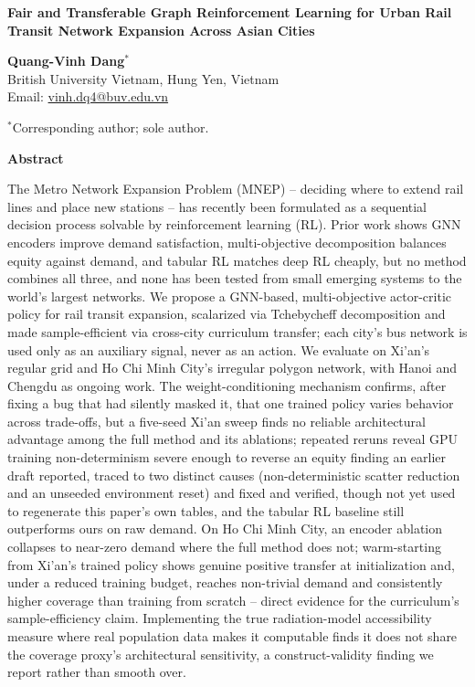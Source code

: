 \documentclass[11pt,a4paper]{article}
\begin{document}
\begin{center}
{\LARGE\bfseries Fair and Transferable Graph Reinforcement Learning for Urban Rail Transit Network Expansion Across Asian Cities}
\end{center}

\vspace{1.5em}
\noindent
\textbf{Quang-Vinh Dang}$^{*}$\\
British University Vietnam, Hung Yen, Vietnam\\
Email: \url{vinh.dq4@buv.edu.vn}

\vspace{1em}
\noindent
$^{*}$Corresponding author; sole author.

\vspace{2em}
\noindent
\textbf{Abstract}

\noindent
The Metro Network Expansion Problem (MNEP) -- deciding where to extend rail lines and place new stations -- has recently been formulated as a sequential decision process solvable by reinforcement learning (RL). Prior work shows GNN encoders improve demand satisfaction, multi-objective decomposition balances equity against demand, and tabular RL matches deep RL cheaply, but no method combines all three, and none has been tested from small emerging systems to the world's largest networks. We propose a GNN-based, multi-objective actor-critic policy for rail transit expansion, scalarized via Tchebycheff decomposition and made sample-efficient via cross-city curriculum transfer; each city's bus network is used only as an auxiliary signal, never as an action. We evaluate on Xi'an's regular grid and Ho Chi Minh City's irregular polygon network, with Hanoi and Chengdu as ongoing work. The weight-conditioning mechanism confirms, after fixing a bug that had silently masked it, that one trained policy varies behavior across trade-offs, but a five-seed Xi'an sweep finds no reliable architectural advantage among the full method and its ablations; repeated reruns reveal GPU training non-determinism severe enough to reverse an equity finding an earlier draft reported, traced to two distinct causes (non-deterministic scatter reduction and an unseeded environment reset) and fixed and verified, though not yet used to regenerate this paper's own tables, and the tabular RL baseline still outperforms ours on raw demand. On Ho Chi Minh City, an encoder ablation collapses to near-zero demand where the full method does not; warm-starting from Xi'an's trained policy shows genuine positive transfer at initialization and, under a reduced training budget, reaches non-trivial demand and consistently higher coverage than training from scratch -- direct evidence for the curriculum's sample-efficiency claim. Implementing the true radiation-model accessibility measure where real population data makes it computable finds it does not share the coverage proxy's architectural sensitivity, a construct-validity finding we report rather than smooth over.
\end{document}
